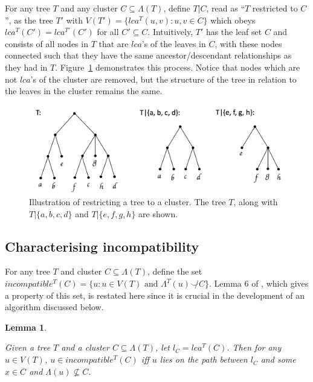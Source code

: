 \documentclass[12pt,a4paper]{article}
\newcommand{\compatible}{\smile}
\newcommand{\leafset}{\Lambda}
\newtheorem{incompatibility}{Lemma}
\begin{document}
    For any tree $T$ and any cluster $C \subseteq \leafset(T)$, define $T|C$, read as ``$T$ restricted to $C$'', as the tree $T'$ with $V(T') = \{lca^T(u, v) : u, v \in C\}$ which obeys $lca^T(C') = lca^{T'}(C')$ for all $C' \subseteq C$. Intuitively, $T'$ has the leaf set $C$ and consists of all nodes in $T$ that are $lca$'s of the leaves in $C$, with these nodes connected such that they have the same ancestor/descendant relationships as they had in $T$. Figure~\ref{fig:restrictedtree} demonstrates this process. Notice that nodes which are not $lca$'s of the cluster are removed, but the structure of the tree in relation to the leaves in the cluster remains the same.

    \begin{figure}[ht]
        \includegraphics[scale=0.5]{restrictedsubtree}
        \centering
        \caption[Restricted Trees]{Illustration of restricting a tree to a cluster. The tree $T$, along with $T|\{a, b, c, d\}$ and $T|\{e, f, g, h\}$ are shown.}
        \label{fig:restrictedtree}
    \end{figure}

    \subsection{Characterising incompatibility}

    For any tree $T$ and cluster $C \subseteq \leafset(T)$, define the set $incompatible^{T}(C) = \{u : u \in V(T) \text{ and } \leafset^{T}(u) \not\compatible C\}$. Lemma 6 of \cite{jansson2018algorithms}, which gives a property of this set, is restated here since it is crucial in the development of an algorithm discussed below.
    \newline

    \begin{incompatibility}
        \label{lem:incompatibility}

        Given a tree $T$ and a cluster $C \subseteq \leafset(T)$, let $l_C = lca^T(C)$. Then for any $u \in V(T)$, $u \in incompatible^{T}(C)$ iff $u$ lies on the path between $l_C$ and some $x \in C$ and $\leafset(u) \not\subseteq C$.
    \end{incompatibility}
\end{document}

